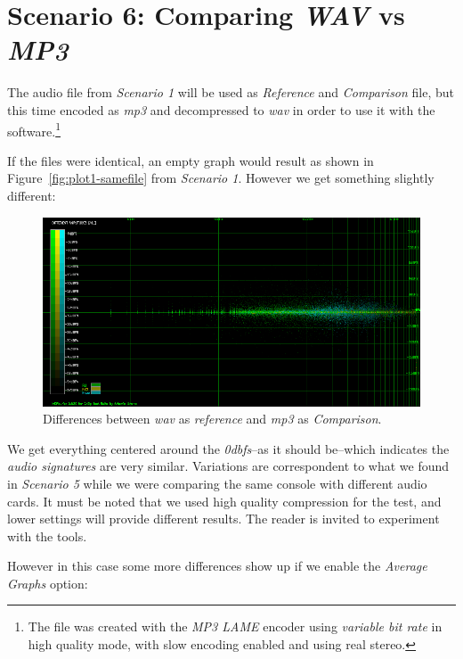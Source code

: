 \documentclass[10pt,a4paper]{report}
\newcommand{\ac}[1]{\textit{\mbox{\acrshort{#1}}}}
\newcommand{\db}[1]{\textit{\mbox{#1\acrshort{dbfs}}}}
\begin{document}
\section{Scenario 6: Comparing \textit{WAV} vs \textit{MP3}}
\label{mp3chap}

The audio file from \textit{Scenario 1} will be used as \textit{Reference} and \textit{Comparison} file, but this time encoded as \ac{mp3} and decompressed to \ac{wav} in order to use it with the software.\footnote{The file was created with the \textit{MP3 LAME} encoder using \textit{variable bit rate} in high quality mode, with slow encoding enabled and using real stereo.}

If the files were identical, an empty graph would result as shown in Figure~\ref{fig:plot1-samefile} from \textit{Scenario 1}. However we get something slightly different:

\begin{figure}[H]
	\centering
	\includegraphics[width=1.0\linewidth]{images/interpretation/Plot6-mp3-1.png}
	\caption[WAV vs MP3]{Differences between \ac{wav} as \textit{reference} and \ac{mp3} as \textit{Comparison}.}
	\label{fig:plot6-mp3-1}
\end{figure}

We get everything centered around the \db{0}--as it should be--which indicates the \textit{audio signatures} are very similar. Variations are correspondent to what we found in \textit{Scenario 5} while we were comparing the same console with different audio cards. It must be noted that we used high quality compression for the test, and lower settings will provide different results. The reader is invited to experiment with the tools.

However in this case some more differences show up if we enable the \textit{Average Graphs} option:
\end{document}
